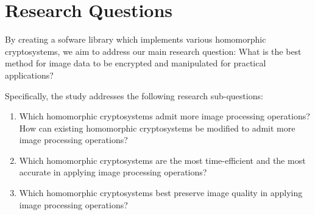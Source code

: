 \section{Research Questions}

By creating a sofware library which implements various homomorphic cryptosystems, we aim to address our main research question: What is the best method for image data to be encrypted and manipulated for practical applications?

Specifically, the study addresses the following research sub-questions:
\begin{enumerate}
	\item Which homomorphic cryptosystems admit more image processing operations? How can existing homomorphic cryptosystems be modified to admit more image processing operations?
	\item Which homomorphic cryptosystems are the most time-efficient and the most accurate in applying image processing operations?
	\item Which homomorphic cryptosystems best preserve image quality in applying image processing operations?
\end{enumerate}
